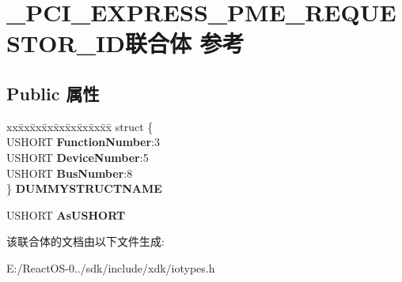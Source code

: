 \hypertarget{union___p_c_i___e_x_p_r_e_s_s___p_m_e___r_e_q_u_e_s_t_o_r___i_d}{}\section{\+\_\+\+P\+C\+I\+\_\+\+E\+X\+P\+R\+E\+S\+S\+\_\+\+P\+M\+E\+\_\+\+R\+E\+Q\+U\+E\+S\+T\+O\+R\+\_\+\+I\+D联合体 参考}
\label{union___p_c_i___e_x_p_r_e_s_s___p_m_e___r_e_q_u_e_s_t_o_r___i_d}
\subsection*{Public 属性}
\begin{DoxyCompactItemize}
\item 
\mbox{\label{union___p_c_i___e_x_p_r_e_s_s___p_m_e___r_e_q_u_e_s_t_o_r___i_d_a0a003d4880ec007b41d6aaf8093651e7}} 
\begin{tabbing}
xx\=xx\=xx\=xx\=xx\=xx\=xx\=xx\=xx\=\kill
struct \{\\
\>USHORT {\bfseries FunctionNumber}:3\\
\>USHORT {\bfseries DeviceNumber}:5\\
\>USHORT {\bfseries BusNumber}:8\\
\} {\bfseries DUMMYSTRUCTNAME}\\

\end{tabbing}\item 
\mbox{\label{union___p_c_i___e_x_p_r_e_s_s___p_m_e___r_e_q_u_e_s_t_o_r___i_d_a49808ff1309cee94b3aa280360bb73ce}} 
U\+S\+H\+O\+RT {\bfseries As\+U\+S\+H\+O\+RT}
\end{DoxyCompactItemize}


该联合体的文档由以下文件生成\+:\begin{DoxyCompactItemize}
\item 
E\+:/\+React\+O\+S-\/0../sdk/include/xdk/iotypes.\+h\end{DoxyCompactItemize}
